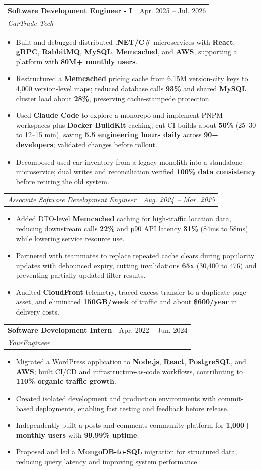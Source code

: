 \documentclass[letterpaper,11pt]{article}
\makeatletter
\newcommand{\resumeItem}[1]{
  \item\small{
    {#1 \vspace{-2pt}}
  }
}
\newcommand{\resumeSubheading}[4]{
  \vspace{-2pt}\item
    \begin{tabular*}{0.97\textwidth}[t]{l@{\extracolsep{\fill}}r}
      \textbf{#1} & #2 \\
      \textit{\small#3} & \textit{\small #4} \\
    \end{tabular*}\vspace{-7pt}
}
\newcommand{\resumeSubSubheading}[2]{
    \item
    \begin{tabular*}{0.97\textwidth}{l@{\extracolsep{\fill}}r}
      \textit{\small#1} & \textit{\small #2} \\
    \end{tabular*}\vspace{-7pt}
}
\newcommand{\resumeItemListStart}{\begin{itemize}}
\newcommand{\resumeItemListEnd}{\end{itemize}\vspace{-5pt}}
\makeatother
\begin{document}
\resumeSubheading
{Software Development Engineer - I}{Apr. 2025 -- Jul. 2026}
{CarTrade Tech}{ }
\resumeItemListStart
\resumeItem{Built and debugged distributed \textbf{.NET/C\#} microservices with \textbf{React}, \textbf{gRPC}, \textbf{RabbitMQ}, \textbf{MySQL}, \textbf{Memcached}, and \textbf{AWS}, supporting a platform with \textbf{80M+ monthly users}.}
\resumeItem{Restructured a \textbf{Memcached} pricing cache from 6.15M version-city keys to 4,000 version-level maps; reduced database calls \textbf{93\%} and shared \textbf{MySQL} cluster load about \textbf{28\%}, preserving cache-stampede protection.}
\resumeItem{Used \textbf{Claude Code} to explore a monorepo and implement PNPM workspaces plus \textbf{Docker BuildKit} caching; cut CI builds about \textbf{50\%} (25--30 to 12--15 min), saving \textbf{5.5 engineering hours daily} across \textbf{90+ developers}; validated changes before rollout.}
\resumeItem{Decomposed used-car inventory from a legacy monolith into a standalone microservice; dual writes and reconciliation verified \textbf{100\% data consistency} before retiring the old system.}
\resumeItemListEnd
\resumeSubSubheading
{Associate Software Development Engineer}{Aug. 2024 -- Mar. 2025}
\resumeItemListStart
\resumeItem{Added DTO-level \textbf{Memcached} caching for high-traffic location data, reducing downstream calls \textbf{22\%} and p90 API latency \textbf{31\%} (84ms to 58ms) while lowering service resource use.}
\resumeItem{Partnered with teammates to replace repeated cache clears during popularity updates with debounced expiry, cutting invalidations \textbf{65x} (30,400 to 476) and preventing partially updated filter results.}
\resumeItem{Audited \textbf{CloudFront} telemetry, traced excess transfer to a duplicate page asset, and eliminated \textbf{150GB/week} of traffic and about \textbf{\$600/year} in delivery costs.}
\resumeItemListEnd

\resumeSubheading
{Software Development Intern}{Apr. 2022 -- Jun. 2024}
{YourEngineer}{ }
\resumeItemListStart
\resumeItem{Migrated a WordPress application to \textbf{Node.js}, \textbf{React}, \textbf{PostgreSQL}, and \textbf{AWS}; built CI/CD and infrastructure-as-code workflows, contributing to \textbf{110\% organic traffic growth}.}
\resumeItem{Created isolated development and production environments with commit-based deployments, enabling fast testing and feedback before release.}
\resumeItem{Independently built a posts-and-comments community platform for \textbf{1,000+ monthly users} with \textbf{99.99\% uptime}.}
\resumeItem{Proposed and led a \textbf{MongoDB-to-SQL} migration for structured data, reducing query latency and improving system performance.}
\resumeItemListEnd
\end{document}
